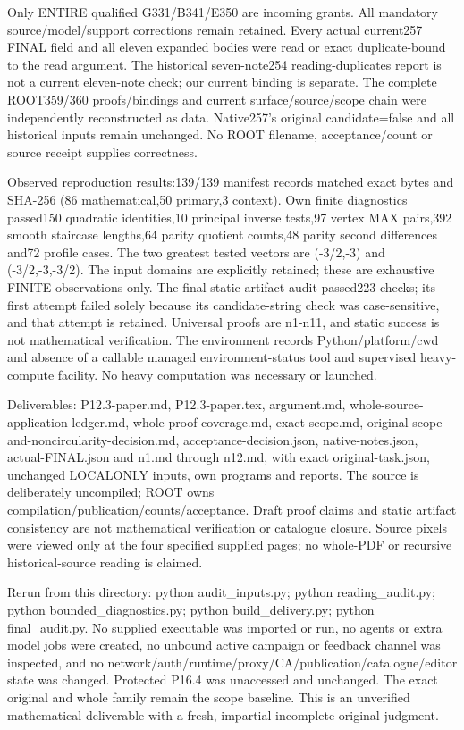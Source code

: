 \documentclass[11pt]{article}
\begin{document}
Only ENTIRE qualified G331/B341/E350 are incoming grants. All mandatory source/model/support corrections remain retained. Every actual current257 FINAL field and all eleven expanded bodies were read or exact duplicate-bound to the read argument. The historical seven-note254 reading-duplicates report is not a current eleven-note check; our current binding is separate. The complete ROOT359/360 proofs/bindings and current surface/source/scope chain were independently reconstructed as data. Native257's original candidate=false and all historical inputs remain unchanged. No ROOT filename, acceptance/count or source receipt supplies correctness.

Observed reproduction results:139/139 manifest records matched exact bytes and SHA-256 (86 mathematical,50 primary,3 context). Own finite diagnostics passed150 quadratic identities,10 principal inverse tests,97 vertex MAX pairs,392 smooth staircase lengths,64 parity quotient counts,48 parity second differences and72 profile cases. The two greatest tested vectors are (-3/2,-3) and (-3/2,-3,-3/2). The input domains are explicitly retained; these are exhaustive FINITE observations only. The final static artifact audit passed223 checks; its first attempt failed solely because its candidate-string check was case-sensitive, and that attempt is retained. Universal proofs are n1-n11, and static success is not mathematical verification. The environment records Python/platform/cwd and absence of a callable managed environment-status tool and supervised heavy-compute facility. No heavy computation was necessary or launched.

Deliverables: P12.3-paper.md, P12.3-paper.tex, argument.md, whole-source-application-ledger.md, whole-proof-coverage.md, exact-scope.md, original-scope-and-noncircularity-decision.md, acceptance-decision.json, native-notes.json, actual-FINAL.json and n1.md through n12.md, with exact original-task.json, unchanged LOCALONLY inputs, own programs and reports. The source is deliberately uncompiled; ROOT owns compilation/publication/counts/acceptance. Draft proof claims and static artifact consistency are not mathematical verification or catalogue closure. Source pixels were viewed only at the four specified supplied pages; no whole-PDF or recursive historical-source reading is claimed.

Rerun from this directory: python audit\_inputs.py; python reading\_audit.py; python bounded\_diagnostics.py; python build\_delivery.py; python final\_audit.py. No supplied executable was imported or run, no agents or extra model jobs were created, no unbound active campaign or feedback channel was inspected, and no network/auth/runtime/proxy/CA/publication/catalogue/editor state was changed. Protected P16.4 was unaccessed and unchanged. The exact original and whole family remain the scope baseline. This is an unverified mathematical deliverable with a fresh, impartial incomplete-original judgment.
\end{document}
